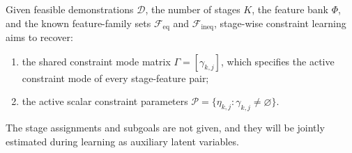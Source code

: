 \begin{definition}
Given feasible demonstrations $\mathcal{D}$, the number of stages $K$, the feature bank $\Phi$, and the known feature-family sets $\mathcal{F}_{\mathrm{eq}}$ and $\mathcal{F}_{\mathrm{ineq}}$, stage-wise constraint learning aims to recover:
\begin{enumerate}
    \item the shared constraint mode matrix $\Gamma=[\gamma_{k,j}]$, which specifies the active constraint mode of every stage-feature pair;
    \item the active scalar constraint parameters $\mathcal{P}=\{\eta_{k,j}:\gamma_{k,j}\neq\varnothing\}$.
\end{enumerate}
The stage assignments and subgoals are not given, and they will be jointly estimated during learning as auxiliary latent variables.
\end{definition}
